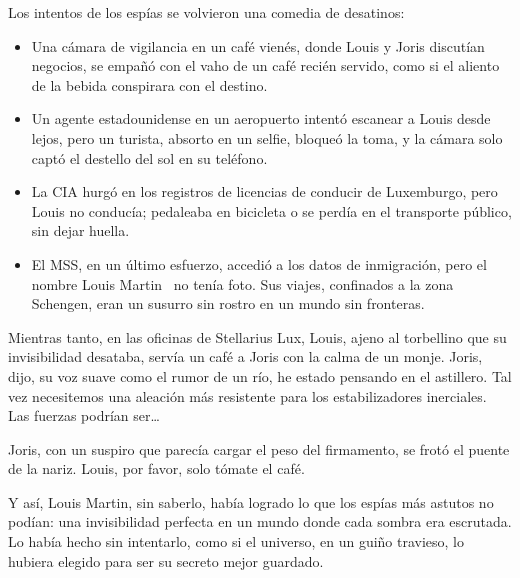 Los intentos de los espías se volvieron una comedia de desatinos:

\begin{itemize}
    \item Una cámara de vigilancia en un café vienés, donde Louis y Joris discutían negocios, se empañó con el vaho de un café recién servido, como si el aliento de la bebida conspirara con el destino.
    \item Un agente estadounidense en un aeropuerto intentó escanear a Louis desde lejos, pero un turista, absorto en un selfie, bloqueó la toma, y la cámara solo captó el destello del sol en su teléfono.
    \item La CIA hurgó en los registros de licencias de conducir de Luxemburgo, pero Louis no conducía; pedaleaba en bicicleta o se perdía en el transporte público, sin dejar huella.
    \item El MSS, en un último esfuerzo, accedió a los datos de inmigración, pero el nombre \glqq Louis Martin\grqq~ no tenía foto. Sus viajes, confinados a la zona Schengen, eran un susurro sin rostro en un mundo sin fronteras.
\end{itemize}

Mientras tanto, en las oficinas de Stellarius Lux, Louis, ajeno al torbellino que su invisibilidad desataba, servía un café a Joris con la calma de un monje. \glqq Joris,\grqq~ dijo, su voz suave como el rumor de un río, \glqq he estado pensando en el astillero. Tal vez necesitemos una aleación más resistente para los estabilizadores inerciales. Las fuerzas podrían ser\ldots\grqq

Joris, con un suspiro que parecía cargar el peso del firmamento, se frotó el puente de la nariz. \glqq Louis, por favor, solo tómate el café.\grqq

Y así, Louis Martin, sin saberlo, había logrado lo que los espías más astutos no podían: una invisibilidad perfecta en un mundo donde cada sombra era escrutada. Lo había hecho sin intentarlo, como si el universo, en un guiño travieso, lo hubiera elegido para ser su secreto mejor guardado.
